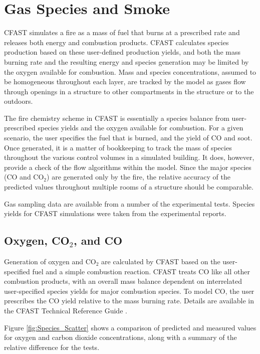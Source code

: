 \chapter{Gas Species and Smoke}

CFAST simulates a fire as a mass of fuel that burns at a prescribed rate and releases both energy and combustion products.  CFAST calculates species production based on these user-defined production yields, and both the mass burning rate and the resulting energy and species generation may be limited by the oxygen available for combustion.  Mass and species concentrations, assumed to be homogeneous throughout each layer, are tracked by the model as gases flow through openings in a structure to other compartments in the structure or to the outdoors.

The fire chemistry scheme in CFAST is essentially a species balance from user-prescribed species yields and the oxygen available for combustion.  For a given scenario, the user specifies the fuel that is burned, and the yield of CO and soot. Once generated, it is a matter of bookkeeping to track the mass of species throughout the various control volumes in a simulated building.  It does, however, provide a check of the flow algorithms within the model. Since the major species (CO and CO$_2$) are generated only by the fire, the relative accuracy of the predicted values throughout multiple rooms of a structure should be comparable.

Gas sampling data are available from a number of the experimental tests. Species yields for CFAST simulations were taken from the experimental reports.

\section{Oxygen, CO$_2$, and CO}

Generation of oxygen and CO$_2$ are calculated by CFAST based on the user-specified fuel and a simple combustion reaction. CFAST treats CO like all other combustion products, with an overall mass balance dependent on interrelated user-specified species yields for major combustion species. To model CO, the user prescribes the CO yield relative to the mass burning rate. Details are available in the CFAST Technical Reference Guide \cite{CFAST_Tech_Guide_7}.  

Figure \ref{fig:Species_Scatter} shows a comparison of predicted and measured values for oxygen and carbon dioxide concentrations, along with a summary of the relative difference for the tests.
\label{Oxygen Concentration}
\label{Carbon Dioxide Concentration}
\label{Carbon Monoxide Concentration}

